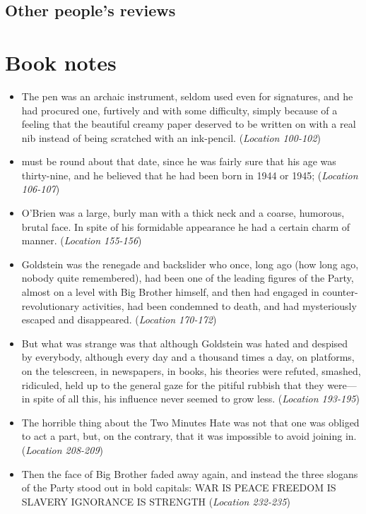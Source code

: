 \documentclass[12pt]{article}
\begin{document}
\subsection{Other people's reviews}
\newpage

\section{Book notes}

\begin{itemize}
\item {The pen was an archaic instrument, seldom used even for signatures, and he had procured one, furtively and with some difficulty, simply because of a feeling that the beautiful creamy paper deserved to be written on with a real nib instead of being scratched with an ink-pencil. (\textit{Location 100-102})}
\item {must be round about that date, since he was fairly sure that his age was thirty-nine, and he believed that he had been born in 1944 or 1945; (\textit{Location 106-107})}
\item {O’Brien was a large, burly man with a thick neck and a coarse, humorous, brutal face. In spite of his formidable appearance he had a certain charm of manner. (\textit{Location 155-156})}
\item {Goldstein was the renegade and backslider who once, long ago (how long ago, nobody quite remembered), had been one of the leading figures of the Party, almost on a level with Big Brother himself, and then had engaged in counter-revolutionary activities, had been condemned to death, and had mysteriously escaped and disappeared. (\textit{Location 170-172})}
\item {But what was strange was that although Goldstein was hated and despised by everybody, although every day and a thousand times a day, on platforms, on the telescreen, in newspapers, in books, his theories were refuted, smashed, ridiculed, held up to the general gaze for the pitiful rubbish that they were—in spite of all this, his influence never seemed to grow less. (\textit{Location 193-195})}
\item {The horrible thing about the Two Minutes Hate was not that one was obliged to act a part, but, on the contrary, that it was impossible to avoid joining in. (\textit{Location 208-209})}
\item {Then the face of Big Brother faded away again, and instead the three slogans of the Party stood out in bold capitals: WAR IS PEACE FREEDOM IS SLAVERY IGNORANCE IS STRENGTH (\textit{Location 232-235})}

\end{itemize}
\end{document}
